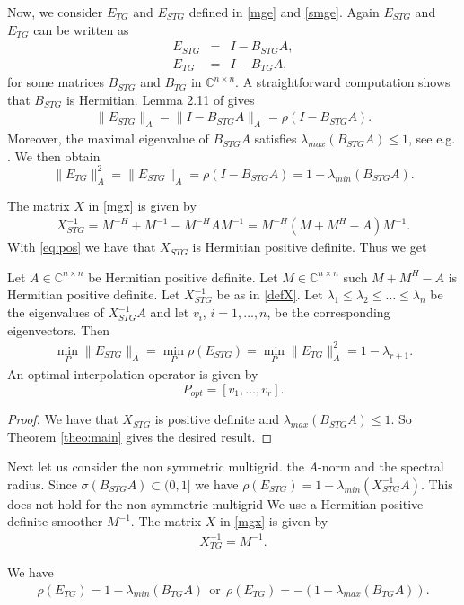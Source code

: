 \documentclass[final]{siamltex}
\newcommand{\beqo}{\begin{eqnarray*}}
\newcommand{\beq}{\begin{eqnarray}}
\newcommand{\eeqo}{\end{eqnarray*}}
\newcommand{\eeq}{\end{eqnarray}}
\numberwithin{equation}{section}
\newcommand{\Cnn}{\mathbb{C}^{n \times n}}
\newcommand{\inCnn}{\in \mathbb{C}^{n \times n}}
\begin{document}
Now, we consider $E_{TG}$ and $E_{STG}$  defined in \eqref{mge}  and
\eqref{smge}. Again   $E_{STG}$ and $E_{TG}$    can be written   as
\beqo
E_{STG} & = & I - B_{STG}A, \\
E_{TG} & = & I - B_{TG}A,
\eeqo
for some  matrices $B_{STG}$ and $B_{TG}$ in $\Cnn$. A straightforward
computation shows  that  $B_{STG}$  is Hermitian. Lemma 2.11 of \cite{Ben01}
gives
\beq \label{ben}
\|E_{STG}\|_A = \|I - B_{STG}A\|_A = \rho(I - B_{STG}A).
\eeq
Moreover, the maximal eigenvalue of $B_{STG}A$ satisfies
$\lambda_{max}(B_{STG}A) \leq 1$, see e.g. \cite{Vas08}. We then obtain
\[
\|E_{TG}\|_A^2 = \|E_{STG}\|_A = \rho(I - B_{STG}A) = 1 -
\lambda_{min}(B_{STG}A).
\]


The matrix $X$ in \eqref{mgx} is given by 
\beq \label{defX}
X^{-1}_{STG} = M^{-H} +  M^{-1} - M^{-H} AM^{-1} = M^{-H}( M +  M^{H} -
A)M^{-1}.
\eeq
With \eqref{eq:pos} we have  that $X_{STG}$ is Hermitian positive definite.
Thus  we get

\begin{corollary} \label{coro:one}
Let  $A\inCnn$  be Hermitian positive definite. Let $ M \inCnn$ such $M + M^H -
A$ is Hermitian positive definite.
Let $X_{STG}^{-1}$  be as in \eqref{defX}.  
 Let $
\lambda_1 \leq \lambda_2 \leq \ldots \leq  \lambda_n $
be the  eigenvalues of $X_{STG}^{-1}A$  and let $v_i$, $i = 1, \ldots, n$, be
the corresponding eigenvectors. Then
\beq
\min_{P} \|E_{STG}\|_A = \min_{P}\rho(E_{STG}) =  \min_{P}\|E_{TG}\|_A^2 = 1 -
\lambda_{r+1}.
\eeq
An optimal interpolation operator is given by 
\[
P_{opt} = [v_{1}, \ldots , v_r].
\]
\end{corollary}
\begin{proof}
We have  that $X_{STG}$ is positive definite and $\lambda_{max}(B_{STG}A) \leq
1$. So Theorem \ref{theo:main} gives the desired result.
\end{proof}

Next  let us consider  the non symmetric  multigrid. 
the $A$-norm and the spectral radius. Since $\sigma(B_{STG}A) \subset (0,1]$
we have   $\rho(E_{STG}) = 1 - \lambda_{min}(X_{STG}^{-1}A)$. This does not
hold for the non symmetric multigrid
We use a Hermitian positive  definite smoother $M^{-1}$. The matrix $X$ in
\eqref{mgx} is given by
\beq \label{defXtg}
X^{-1}_{TG} = M^{-1}.
\eeq

We have
\beqo
\rho(E_{TG}) = 1 - \lambda_{min}(B_{TG}A)
\ \  \mbox{or} \ \ 
\rho(E_{TG}) = -(1 - \lambda_{max}(B_{TG}A)).
\eeqo
\end{document}
